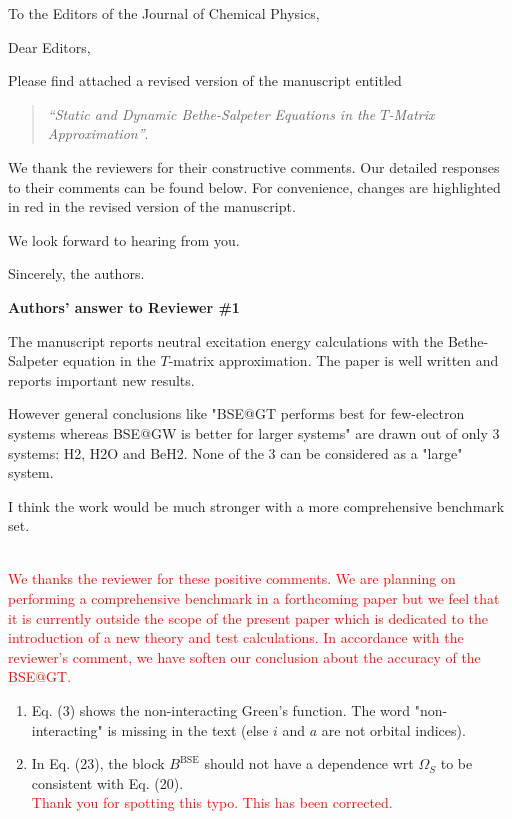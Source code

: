 \documentclass[10pt]{letter}
\newcommand{\alert}[1]{\textcolor{red}{#1}}
\begin{document}
\begin{letter}%
{To the Editors of the Journal of Chemical Physics,}

\opening{Dear Editors,}

\justifying
Please find attached a revised version of the manuscript entitled 
\begin{quote}
	\textit{``Static and Dynamic Bethe-Salpeter Equations in the $T$-Matrix Approximation''}.
\end{quote}
We thank the reviewers for their constructive comments.
Our detailed responses to their comments can be found below.
For convenience, changes are highlighted in red in the revised version of the manuscript. 

We look forward to hearing from you.

\closing{Sincerely, the authors.}

\newpage

\noindent \textbf{\large Authors' answer to Reviewer \#1}
 
{The manuscript reports neutral excitation energy calculations with the Bethe-Salpeter equation in the $T$-matrix approximation. 
The paper is well written and reports important new results. 

However general conclusions like "BSE@GT performs best for few-electron systems whereas BSE@GW is better for larger systems" 
are drawn out of only 3 systems: H2, H2O and BeH2. None of the 3 can be considered as a "large" system. 

I think the work would be much stronger with a more comprehensive benchmark set.}
\\
\alert{
We thanks the reviewer for these positive comments.
We are planning on performing a comprehensive benchmark in a forthcoming paper but we feel that it is currently outside the scope of the present paper which is dedicated to the introduction of a new theory and test calculations.
In accordance with the reviewer's comment, we have soften our conclusion about the accuracy of the BSE@GT.
}

\begin{enumerate}

\item 
{Eq. (3) shows the non-interacting Green's function. 
The word "non-interacting" is missing in the text (else $i$ and $a$ are not orbital indices). }
\\
\alert{
}

\item 
{In Eq. (23), the block $B^\text{BSE}$ should not have a dependence wrt $\Omega_S$ to be consistent with Eq. (20).}
\\
\alert{
Thank you for spotting this typo. 
This has been corrected.
}


\end{enumerate}
\end{letter}
\end{document}
